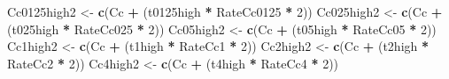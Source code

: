 \documentclass[
]{krantz}
\makeatletter
\newenvironment{Shaded}{\begin{snugshade}}{\end{snugshade}}
\newcommand{\DecValTok}[1]{\textcolor[rgb]{0.00,0.00,0.81}{#1}}
\newcommand{\KeywordTok}[1]{\textcolor[rgb]{0.13,0.29,0.53}{\textbf{#1}}}
\newcommand{\NormalTok}[1]{#1}
\newcommand{\OperatorTok}[1]{\textcolor[rgb]{0.81,0.36,0.00}{\textbf{#1}}}
\newcommand{\StringTok}[1]{\textcolor[rgb]{0.31,0.60,0.02}{#1}}
\newenvironment{kframe}{%
\medskip{}
\setlength{\fboxsep}{.8em}
 \def\at@end@of@kframe{}%
 \ifinner\ifhmode%
  \def\at@end@of@kframe{\end{minipage}}%
  \begin{minipage}{\columnwidth}%
 \fi\fi%
 \def\FrameCommand##1{\hskip\@totalleftmargin \hskip-\fboxsep
 \colorbox{shadecolor}{##1}\hskip-\fboxsep
     \hskip-\linewidth \hskip-\@totalleftmargin \hskip\columnwidth}%
 \MakeFramed {\advance\hsize-\width
   \@totalleftmargin\z@ \linewidth\hsize
   \@setminipage}}%
 {\par\unskip\endMakeFramed%
 \at@end@of@kframe}
\renewenvironment{Shaded}{\begin{kframe}}{\end{kframe}}
\makeatother
\begin{document}
\begin{Shaded}
\begin{Highlighting}[]
\NormalTok{Cc0125high2 \textless{}{-}}\StringTok{ }\KeywordTok{c}\NormalTok{(Cc }\OperatorTok{+}\StringTok{ }\NormalTok{(t0125high }\OperatorTok{*}\StringTok{ }\NormalTok{RateCc0125 }\OperatorTok{*}\StringTok{ }\DecValTok{2}\NormalTok{))}
\NormalTok{Cc025high2 \textless{}{-}}\StringTok{ }\KeywordTok{c}\NormalTok{(Cc }\OperatorTok{+}\StringTok{ }\NormalTok{(t025high }\OperatorTok{*}\StringTok{ }\NormalTok{RateCc025 }\OperatorTok{*}\StringTok{ }\DecValTok{2}\NormalTok{))}
\NormalTok{Cc05high2 \textless{}{-}}\StringTok{ }\KeywordTok{c}\NormalTok{(Cc }\OperatorTok{+}\StringTok{ }\NormalTok{(t05high }\OperatorTok{*}\StringTok{ }\NormalTok{RateCc05 }\OperatorTok{*}\StringTok{ }\DecValTok{2}\NormalTok{))}
\NormalTok{Cc1high2 \textless{}{-}}\StringTok{ }\KeywordTok{c}\NormalTok{(Cc }\OperatorTok{+}\StringTok{ }\NormalTok{(t1high }\OperatorTok{*}\StringTok{ }\NormalTok{RateCc1 }\OperatorTok{*}\StringTok{ }\DecValTok{2}\NormalTok{))}
\NormalTok{Cc2high2 \textless{}{-}}\StringTok{ }\KeywordTok{c}\NormalTok{(Cc }\OperatorTok{+}\StringTok{ }\NormalTok{(t2high }\OperatorTok{*}\StringTok{ }\NormalTok{RateCc2 }\OperatorTok{*}\StringTok{ }\DecValTok{2}\NormalTok{))}
\NormalTok{Cc4high2 \textless{}{-}}\StringTok{ }\KeywordTok{c}\NormalTok{(Cc }\OperatorTok{+}\StringTok{ }\NormalTok{(t4high }\OperatorTok{*}\StringTok{ }\NormalTok{RateCc4 }\OperatorTok{*}\StringTok{ }\DecValTok{2}\NormalTok{))}


\end{Highlighting}
\end{Shaded}
\end{document}
